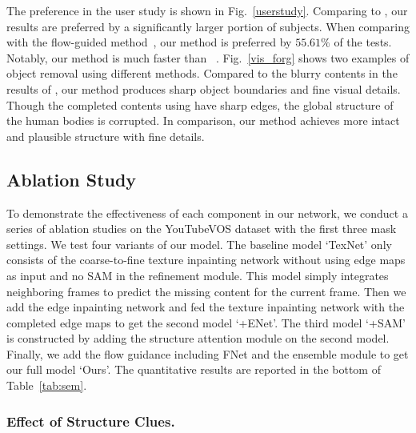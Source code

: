 The preference in the user study is shown in Fig.~\ref{userstudy}. 
Comparing to \cite{nazeri2019edgeconnect,wang2019video,Kim_2019_CVPR1}, our results are preferred by a significantly larger portion of subjects.
%
When comparing with the flow-guided method~\cite{Xu_2019_CVPR}, our method is preferred by $55.61\%$ of the tests. 
Notably, our method is much faster than ~\cite{Xu_2019_CVPR}.
%
Fig.~\ref{vis_forg} shows two examples of object removal using different methods. 
Compared to the blurry contents in the results of \cite{nazeri2019edgeconnect,wang2019video,Kim_2019_CVPR1}, our method produces sharp object boundaries and fine visual details. 
Though the completed contents using \cite{Xu_2019_CVPR} have sharp edges, the global structure of the human bodies is corrupted. In comparison, our method achieves more intact and plausible structure with fine details.


 


\subsection{Ablation Study}
To demonstrate the effectiveness of each component in our network, we conduct a series of ablation studies on the YouTubeVOS dataset with the first three mask settings. 
%
We test four variants of our model. 
The baseline model `TexNet' only consists of the coarse-to-fine texture inpainting network without using edge maps as input and no SAM in the refinement module.
This model simply integrates neighboring frames to predict the missing content for the current frame.
%
Then we add the edge inpainting network and fed the texture inpainting network with the completed edge maps to get the second model `+ENet'.
The third model `+SAM' is constructed by adding the structure attention module on the second model. 
Finally, we add the flow guidance including FNet and the ensemble module to get our full model `Ours'.
The quantitative results are reported in the bottom of Table~\ref{tab:sem}. 


\subsubsection{Effect of Structure Clues.}


